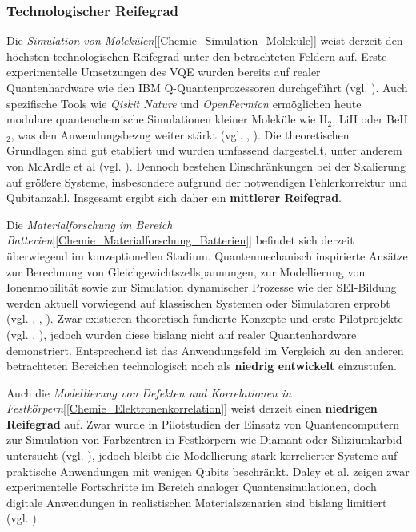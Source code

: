 \subsubsection{Technologischer Reifegrad}

Die \textit{Simulation von Molekülen}[\ref{Chemie_Simulation_Moleküle}] weist derzeit den höchsten technologischen Reifegrad unter den betrachteten Feldern auf. Erste experimentelle Umsetzungen des VQE wurden bereits auf realer Quantenhardware wie den IBM Q-Quantenprozessoren durchgeführt (vgl. \cite{kandala_hardware-efficient_2017}). Auch spezifische Tools wie \textit{Qiskit Nature} und \textit{OpenFermion} ermöglichen heute modulare quantenchemische Simulationen kleiner Moleküle wie H$_2$, LiH oder BeH$_2$, was den Anwendungsbezug weiter stärkt (vgl. \cite{the_qiskit_nature_development_team_qiskit_2023}, \cite{mcardle_quantum_2020}). Die theoretischen Grundlagen sind gut etabliert und wurden umfassend dargestellt, unter anderem von McArdle et al (vgl. \cite{mcardle_quantum_2020}). Dennoch bestehen Einschränkungen bei der Skalierung auf größere Systeme, insbesondere aufgrund der notwendigen Fehlerkorrektur und Qubitanzahl. Insgesamt ergibt sich daher ein \textbf{mittlerer Reifegrad}.

\vspace{0.5em}

Die \textit{Materialforschung im Bereich Batterien}[\ref{Chemie_Materialforschung_Batterien}] befindet sich derzeit überwiegend im konzeptionellen Stadium. Quantenmechanisch inspirierte Ansätze zur Berechnung von Gleichgewichtszellspannungen, zur Modellierung von Ionenmobilität sowie zur Simulation dynamischer Prozesse wie der SEI-Bildung werden aktuell vorwiegend auf klassischen Systemen oder Simulatoren erprobt (vgl. \cite{urban_computational_2016}, \cite{hanaor_computational_2024}, \cite{weidman_quantum_2024}). Zwar existieren theoretisch fundierte Konzepte und erste Pilotprojekte (vgl. \cite{demirApplicationQuantumComputing2024}, \cite{dlr_basiq_2023}), jedoch wurden diese bislang nicht auf realer Quantenhardware demonstriert. Entsprechend ist das Anwendungsfeld im Vergleich zu den anderen betrachteten Bereichen technologisch noch als  \textbf{niedrig entwickelt} einzustufen.

\vspace{0.5em}

Auch die \textit{Modellierung von Defekten und Korrelationen in Festkörpern}[\ref{Chemie_Elektronenkorrelation}] weist derzeit einen \textbf{niedrigen Reifegrad} auf. Zwar wurde in Pilotstudien der Einsatz von Quantencomputern zur Simulation von Farbzentren in Festkörpern wie Diamant oder Siliziumkarbid untersucht (vgl. \cite{cao_ab_2023}), jedoch bleibt die Modellierung stark korrelierter Systeme auf praktische Anwendungen mit wenigen Qubits beschränkt. Daley et al. zeigen zwar experimentelle Fortschritte im Bereich analoger Quantensimulationen, doch digitale Anwendungen in realistischen Materialszenarien sind bislang limitiert (vgl. \cite{daley_practical_2022}).



